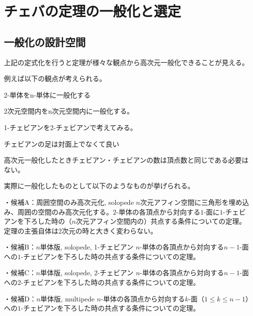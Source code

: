 \documentclass[a4paper,12pt]{bxjsbook}
\newlength{\customindent}
\newenvironment{body}{
  \par
  \begingroup
  \setlength{\leftskip}{\customindent}
  \setlength{\rightskip}{0pt}
  \setlength{\parindent}{1em}
  \setlength{\displayindent}{\customindent}
  \setlength{\displaywidth}{\dimexpr\linewidth-\customindent\relax}
}{
  \par
  \endgroup
}
\theoremstyle{theorem}
\begin{document}
    \chapter{チェバの定理の一般化と選定}
    \section{一般化の設計空間}

    \begin{body}
        \indent 上記の定式化を行うと定理が様々な観点から高次元一般化できることが見える。

        \indent 例えば以下の観点が考えられる。

        \begin{bodyitemize}
            \item 2-単体をn-単体に一般化する
            \item 2次元空間内をn次元空間内に一般化する。
            \item 1-チェビアンを2-チェビアンで考えてみる。
            \item チェビアンの足は対面上でなくて良い
            \item 高次元一般化したときチェビアン・チェビアンの数は頂点数と同じである必要はない。
        \end{bodyitemize}

        \indent 実際に一般化したものとして以下のようなものが挙げられる。

        \begin{bodydescription}
            \item[\hspace*{1.5em}・候補A：周囲空間のみ高次元化, solopede] $n$次元アフィン空間に三角形を埋め込み、周囲の空間のみ高次元化する。$2$-単体の各頂点から対向する$1$-面に$1$-チェビアンを下ろした時の（$n$次元アフィン空間内の）共点する条件についての定理。定理の主張自体は2次元の時と大きく変わらない。
            
            \item[\hspace*{1.5em}・候補B：$n$単体版, solopede, 1-チェビアン] $n$-単体の各頂点から対向する$n-1$-面への$1$-チェビアンを下ろした時の共点する条件についての定理。
            
            \item[\hspace*{1.5em}・候補C：$n$単体版, solopede, 2-チェビアン] $n$-単体の各頂点から対向する$n-1$-面への$2$-チェビアンを下ろした時の共点する条件についての定理。
            
            \item[\hspace*{1.5em}・候補D：$n$単体版, multipede] $n$-単体の各頂点から対向する$k$-面（$1 \leq k \leq n-1$）への$1$-チェビアンを下ろした時の共点する条件についての定理。
        \end{bodydescription}
    \end{body}
\end{document}
